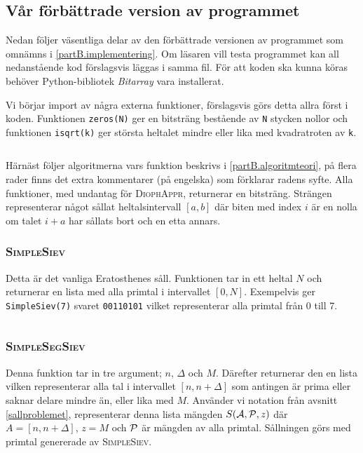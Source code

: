 
\newcommand{\code}[1]{\inputminted[frame=lines,fontsize=\footnotesize,linenos]{python}{code/#1.py}}

\subsection{Vår förbättrade version av programmet}
Nedan följer väsentliga delar av den förbättrade versionen av programmet som omnämns i \ref{partB.implementering}.
Om läsaren vill testa programmet kan all nedanstående kod förslagsvis läggas i samma fil. För att koden ska kunna köras behöver Python-bibliotek \textit{Bitarray} vara installerat.


Vi börjar import av några externa funktioner, förslagsvis görs detta allra först i koden.
Funktionen \texttt{zeros(N)} ger en bitsträng bestående av \texttt{N} stycken nollor och funktionen \texttt{isqrt(k)} ger största heltalet mindre eller lika med kvadratroten av \texttt{k}.
\code{imports}


Härnäst följer algoritmerna vars funktion beskrivs i \ref{partB.algoritmteori}, 
på flera rader finns det extra kommentarer (på engelska) som förklarar radens syfte.
Alla funktioner, med undantag för \textsc{DiophAppr}, returnerar en bitsträng. Strängen representerar något sållat heltalsintervall $[a,b]$ 
där biten med index $i$ är en nolla om talet $i+a$ har sållats bort och en etta annars.


\subsubsection*{\textsc{SimpleSiev}}
Detta är det vanliga Eratosthenes såll. Funktionen tar in ett heltal $N$ och returnerar en lista med alla primtal i intervallet $[0,N]$.
Exempelvis ger \texttt{SimpleSiev(7)} svaret \texttt{00110101} vilket representerar alla primtal från 0 till 7. 
\code{SimpleSiev} 


\subsubsection*{\textsc{SimpleSegSiev}}
Denna funktion tar in tre argument; $n$, $\Delta$ och $M$. Därefter returnerar den en lista vilken representerar alla tal i intervallet $[n, n+\Delta]$ som antingen är prima eller saknar delare mindre än, eller lika med $M$. Använder vi notation från avsnitt \ref{sallproblemet}, representerar denna lista mängden $\S{A}{P}{z}$ där $A=[n, n+\Delta]$, $z=M$ och $\P$ är mängden av alla primtal. Sållningen görs med primtal genererade av \textsc{SimpleSiev}.
\code{SimpleSegSiev} 


